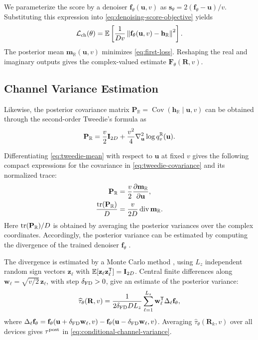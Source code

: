 We parameterize the score by a denoiser $\mathbf f_\theta(\mathbf u,v)$
as $\mathbf s_\theta=2(\mathbf f_\theta-\mathbf u)/v$.
Substituting this expression into \eqref{eq:denoising-score-objective}
yields
\begin{equation}
 \mathcal L_{\rm ch}(\theta)=
 \mathbb{E}\left[\frac{1}{Dv}
 \left\lVert\mathbf f_\theta(\mathbf u,v)-\mathbf h_{\mathbb R}\right\rVert^2\right].
 \label{eq:first-loss}
\end{equation}
The posterior mean $\mathbf m_{\mathbb R}(\mathbf u,v)$ minimizes
\eqref{eq:first-loss}. Reshaping the real and imaginary outputs gives the
complex-valued estimate $\mathbf F_\theta(\mathbf R,v)$.

\subsection{Channel Variance Estimation}
\label{sec:conditional-error}

Likewise, the posterior covariance matrix
$\mathbf P_{\mathbb R}=\operatorname{Cov}(\mathbf h_{\mathbb R}\mid\mathbf u,v)$
can be obtained through the second-order Tweedie's formula as
\begin{equation}
 \mathbf P_{\mathbb R}
 =\frac v2\mathbf{I}_{2D}+\frac{v^2}{4}
   \nabla_{\mathbf u}^2\log q_v^{\mathbb R}(\mathbf u).
 \label{eq:tweedie-covariance}
\end{equation}

Differentiating \eqref{eq:tweedie-mean} with respect to $\mathbf u$
at fixed $v$ gives the following compact expressions for the covariance
in \eqref{eq:tweedie-covariance} and its normalized trace:
\begin{align}
 \mathbf P_{\mathbb R}&=\frac v2\frac{\partial\mathbf m_{\mathbb R}}{\partial\mathbf u},
 \label{eq:mean-derivative-covariance}\\
 \frac{\operatorname{tr}(\mathbf P_{\mathbb R})}{D}&=\frac{v}{2D}\operatorname{div}\mathbf m_{\mathbb R}.
 \label{eq:mean-derivative-variance}
\end{align}
Here $\operatorname{tr}(\mathbf P_{\mathbb R})/D$ is obtained by averaging
the posterior variances over the complex coordinates.
Accordingly, the posterior variance can be estimated
by computing the divergence of the trained denoiser $\mathbf f_\theta$
\cite{manor2024}.

The divergence is estimated by a Monte Carlo method \cite{metzler2016},
using $L_z$ independent random sign vectors $\mathbf z_\ell$ with
$\mathbb{E}[\mathbf z_\ell\mathbf z_\ell^{\mathsf T}]=\mathbf{I}_{2D}$.
Central finite differences along $\mathbf w_\ell=\sqrt{v/2}\,\mathbf z_\ell$,
with step $\delta_{\rm FD}>0$, give an estimate of the posterior variance:
\begin{equation}
 \widehat\tau_\theta(\mathbf R,v)
 =\frac{1}{2\delta_{\rm FD} D L_z}\sum_{\ell=1}^{L_z}
       \mathbf w_\ell^{\mathsf T}\Delta_\ell \mathbf f_\theta,
 \label{eq:derivative-trace}
\end{equation}
where $\Delta_\ell \mathbf f_\theta
 =\mathbf f_\theta(\mathbf u+\delta_{\rm FD}\mathbf w_\ell,v)
 -\mathbf f_\theta(\mathbf u-\delta_{\rm FD}\mathbf w_\ell,v)$.
Averaging $\widehat\tau_\theta(\mathbf R_k,v)$ over all devices gives
$\tau^{\rm post}$ in \eqref{eq:conditional-channel-variance}.

